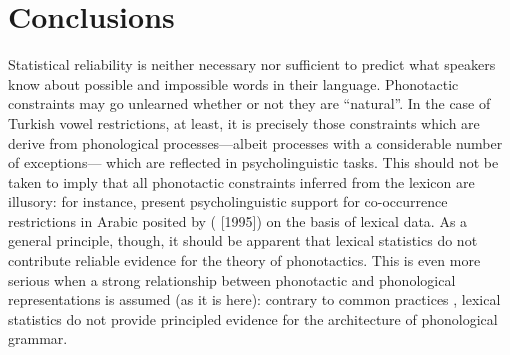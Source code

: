 \section{Conclusions}

Statistical reliability is neither necessary nor sufficient to predict what speakers know about possible and impossible words in their language.
Phonotactic constraints may go unlearned whether or not they are ``natural''.
In the case of Turkish vowel restrictions, at least, it is precisely those constraints which are derive from phonological processes---albeit processes with a considerable number of exceptions--- which are reflected in psycholinguistic tasks.
This should not be taken to imply that all phonotactic constraints inferred from the lexicon are illusory: for instance, \citet{Frisch2001} present psycholinguistic support for co-occurrence restrictions in Arabic posited by \citeauthor{Frisch2004} (\citeyear{Frisch2004} [1995]) on the basis of lexical data.
As a general principle, though, it should be apparent that lexical statistics do not contribute reliable evidence for the theory of phonotactics.
This is even more serious when a strong relationship between phonotactic and phonological representations is assumed (as it is here): contrary to common practices \citep[e.g.,][]{Mester1988,Padgett1991,Padgett1992}, lexical statistics do not provide principled evidence for the architecture of phonological grammar.

